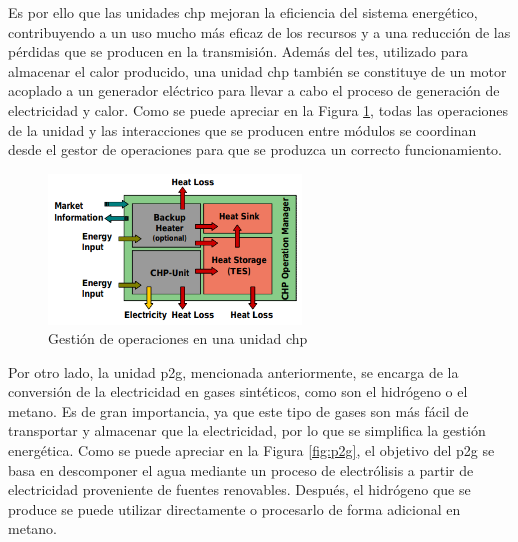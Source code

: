 \pagebreak

Es por ello que las unidades \gls{chp} mejoran la eficiencia del sistema energético, contribuyendo a un uso mucho más eficaz de los recursos y a una reducción de las pérdidas que se producen en la transmisión. Además del \gls{tes}, utilizado para almacenar el calor producido, una unidad \gls{chp} también se constituye de un motor acoplado a un generador eléctrico para llevar a cabo el proceso de generación de electricidad y calor. Como se puede apreciar en la Figura \ref{fig:chp2}, todas las operaciones de la unidad y las interacciones que se producen entre módulos se coordinan desde el gestor de operaciones para que se produzca un correcto funcionamiento.

\vspace{3mm}

\begin{figure}[h!]
  \centering
  \includegraphics[width=0.6\textwidth]{img/teoria/chp2.png}
  \caption{Gestión de operaciones en una unidad \acrshort{chp} \cite{chp2}}
  \label{fig:chp2}
\end{figure}

\vspace{3mm}

Por otro lado, la unidad \gls{p2g}, mencionada anteriormente, se encarga de la conversión de la electricidad en gases sintéticos, como son el hidrógeno o el metano. Es de gran importancia, ya que este tipo de gases son más fácil de transportar y almacenar que la electricidad, por lo que se simplifica la gestión energética. Como se puede apreciar en la Figura \ref{fig:p2g}, el objetivo del \gls{p2g} se basa en descomponer el agua mediante un proceso de electrólisis a partir de electricidad proveniente de fuentes renovables. Después, el hidrógeno que se produce se puede utilizar directamente o procesarlo de forma adicional en metano.~\cite{transactive} 

\vspace{3mm}

